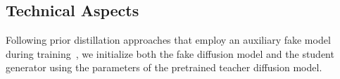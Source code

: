 

\vspace{-1mm}
\subsection{Technical Aspects}
\label{sec:technical aspects}
\vspace{-1mm}
    Following prior distillation approaches that employ an auxiliary fake model during training~\citep{yin2024one, yin2024improved, zhou2024score, zhou2024adversarial, gushchin2025inverse, kornilov2025universal}, we initialize both the fake diffusion model and the student generator using the parameters of the pretrained teacher diffusion model.

